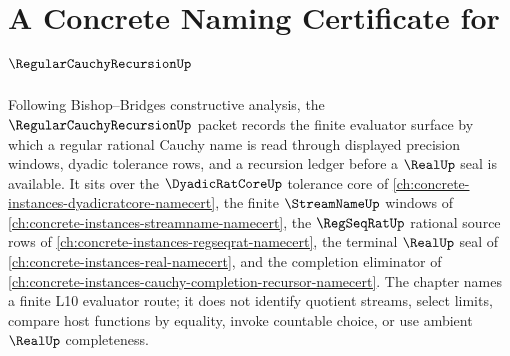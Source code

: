 \chapter{A Concrete Naming Certificate for $\RegularCauchyRecursionUp$}
\label{ch:concrete-instances-regular-cauchy-recursion-namecert}

Following Bishop--Bridges constructive analysis, the $\RegularCauchyRecursionUp$ packet records the finite evaluator surface by which a regular rational Cauchy name is read through displayed precision windows, dyadic tolerance rows, and a recursion ledger before a $\RealUp$ seal is available. It sits over the $\DyadicRatCoreUp$ tolerance core of \autoref{ch:concrete-instances-dyadicratcore-namecert}, the finite $\StreamNameUp$ windows of \autoref{ch:concrete-instances-streamname-namecert}, the $\RegSeqRatUp$ rational source rows of \autoref{ch:concrete-instances-regseqrat-namecert}, the terminal $\RealUp$ seal of \autoref{ch:concrete-instances-real-namecert}, and the completion eliminator of \autoref{ch:concrete-instances-cauchy-completion-recursor-namecert}. The chapter names a finite L10 evaluator route; it does not identify quotient streams, select limits, compare host functions by equality, invoke countable choice, or use ambient $\RealUp$ completeness.

